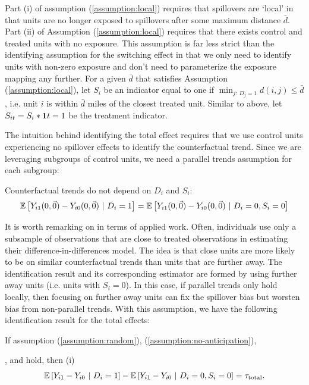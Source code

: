 \documentclass[11pt]{article}
\begin{document}
Part (i) of assumption (\ref{assumption:local}) requires that spillovers are `local' in that units are no longer exposed to spillovers after some maximum distance $\bar{d}$. Part (ii) of Assumption (\ref{assumption:local}) requires that there exists control and treated units with no exposure. This assumption is far less strict than the identifying assumption for the switching effect in that we only need to identify units with non-zero exposure and don't need to parameterize the exposure mapping any further. For a given $\bar{d}$ that satisfies Assumption (\ref{assumption:local}), let $S_{i}$ be an indicator equal to one if $\min_{j: \ D_j = 1} d(i,j) \leq \bar{d}$, i.e. unit $i$ is within $\bar{d}$ miles of the closest treated unit. Similar to above, let $S_{it} = S_i * \mathbf{1}{t = 1}$ be the treatment indicator.

The intuition behind identifying the total effect requires that we use control units experiencing no spillover effects to identify the counterfactual trend. Since we are leveraging subgroups of control units, we need a parallel trends assumption for each subgroup:

\begin{assumption}\label{assumption:parallel-mod}
    Counterfactual trends do not depend on $D_i$ and $S_i$:
    \[
        \mathbb{E}\left[Y_{i1}(0, \vec{0}) - Y_{i0}(0, \vec{0}) \ \vert \ D_i = 1\right]= 
        \mathbb{E}\left[Y_{i1}(0, \vec{0}) - Y_{i0}(0, \vec{0}) \ \vert \ D_i = 0, S_i = 0\right]
    \]
\end{assumption}

It is worth remarking on  in terms of applied work. Often, individuals use only a subsample of observations that are close to treated observations in estimating their difference-in-differences model. The idea is that close units are more likely to be on similar counterfactual trends than units that are further away. The identification result and its corresponding estimator are formed by using further away units (i.e. units with $S_i = 0$). In this case, if parallel trends only hold locally, then focusing on further away units can fix the spillover bias but worsten bias from non-parallel trends. With this assumption, we have the following identification result for the total effects:

\begin{proposition}\label{thm:remove_bias}
    If assumption (\ref{assumption:random}), (\ref{assumption:no-anticipation}), 
    
    \noindent{}, and  hold, then (i) 
    \begin{equation}\label{eq:id_total}
        \mathbb{E}\left[Y_{i1} - Y_{i0} \ \vert \ D_i = 1\right] - \mathbb{E}\left[Y_{i1} - Y_{i0} \ \vert \ D_i = 0, S_{i} = 0\right] = \tau_{\text{total}}.
    \end{equation}
\end{proposition}
\end{document}
